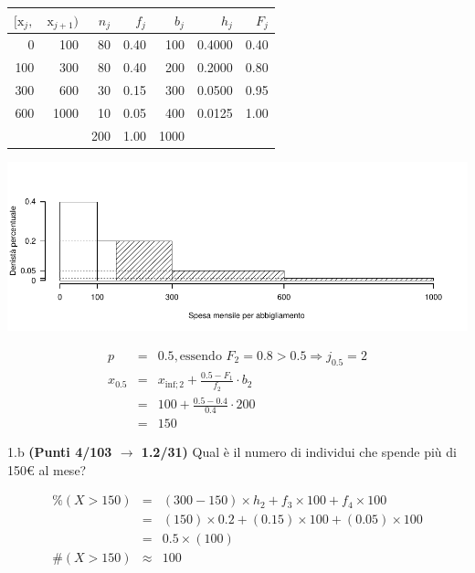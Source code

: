 \documentclass[
  11pt,
]{book}
\theoremstyle{mytheoremstyle}
\theoremstyle{mydefstyle}
\newenvironment{sol}
  {
  \begin{tcolorbox}[enhanced,breakable,arc=0.1mm,boxrule=1pt,colback=white,colframe=iblue,
  title=\bf \fontfamily{lmss}\selectfont \hspace{.5 cm} Soluzione,drop fuzzy shadow]

}{
\end{tcolorbox}
  }
\begin{document}
\begin{sol}

\begin{table}[H]
\centering
\begin{tabular}{rrrrrrr}
\toprule
$[\text{x}_j,$ & $\text{x}_{j+1})$ & $n_j$ & $f_j$ & $b_j$ & $h_j$ & $F_j$\\
\midrule
0 & 100 & 80 & 0.40 & 100 & 0.4000 & 0.40\\
100 & 300 & 80 & 0.40 & 200 & 0.2000 & 0.80\\
300 & 600 & 30 & 0.15 & 300 & 0.0500 & 0.95\\
600 & 1000 & 10 & 0.05 & 400 & 0.0125 & 1.00\\
 &  & 200 & 1.00 & 1000 &  & \\
\bottomrule
\end{tabular}
\end{table}

\begin{center}\includegraphics{Esami_passati_con_soluzioni_files/figure-latex/2023-221-1} \end{center}

\begin{eqnarray*}
  p &=&  0.5 , \text{essendo }F_{ 2 }= 0.8  > 0.5  \Rightarrow j_{ 0.5 }= 2 \\
  x_{ 0.5 } &=& x_{\text{inf}; 2 } + \frac{ { 0.5 } - F_{ 1 }} {f_{ 2 }} \cdot b_{ 2 } \\
            &=&  100  + \frac {{ 0.5 } -  0.4 } { 0.4 } \cdot  200  \\
            &=&  150 
\end{eqnarray*}

\end{sol}

1.b \textbf{(Punti 4/103 \(\rightarrow\) 1.2/31)} Qual è il numero di individui che spende più di 150€ al mese?

\begin{sol}
\begin{eqnarray*}
     \%(X> 150 ) &=& ( 300 - 150 )\times h_{ 2 }+ f_{ 3 }\times 100+f_{ 4 }\times 100 \\
              &=& ( 150 )\times 0.2 + ( 0.15 )\times 100+( 0.05 )\times 100 \\
              &=&  0.5 \times(100)\\
     \#(X> 150 ) &\approx& 100 
         \end{eqnarray*}

\end{sol}
\end{document}
